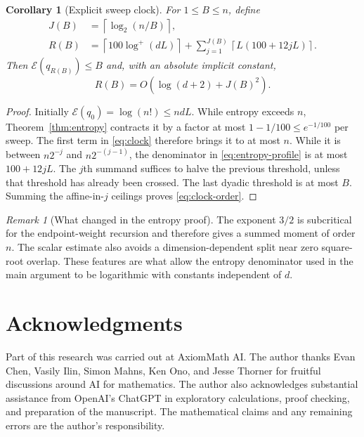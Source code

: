\documentclass[11pt]{article}
\numberwithin{equation}{section}
\newtheorem{corollary}[theorem]{Corollary}
\theoremstyle{definition}\newtheorem{definition}[theorem]{Definition}
\theoremstyle{remark}\newtheorem{remark}[theorem]{Remark}
\newcommand{\Ent}{\mathcal E}
\begin{document}
\begin{corollary}[Explicit sweep clock]\label{cor:clock}
For $1\le B\le n$, define
\begin{align}
 J(B)&=\left\lceil\log_2(n/B)\right\rceil,\nonumber\\
 R(B)&=\left\lceil100\log^+(dL)\right\rceil+
 \sum_{j=1}^{J(B)}\left\lceil L(100+12jL)\right\rceil.
 \label{eq:clock}
\end{align}
Then $\Ent(q_{R(B)})\le B$ and, with an absolute implicit constant,
\begin{equation}\label{eq:clock-order}
 R(B)=O\!\left(\log(d+2)+J(B)^2\right).
\end{equation}
\end{corollary}
\begin{proof}
Initially $\Ent(q_0)=\log(n!)\le ndL$. While entropy exceeds $n$,
Theorem~\ref{thm:entropy} contracts it by a factor at most
$1-1/100\le e^{-1/100}$ per sweep. The first term in \eqref{eq:clock}
therefore brings it to at most $n$. While it is between $n2^{-j}$ and
$n2^{-(j-1)}$, the denominator in \eqref{eq:entropy-profile} is at most
$100+12jL$. The $j$th summand suffices to halve the previous threshold,
unless that threshold has already been crossed. The last dyadic threshold
is at most $B$. Summing the affine-in-$j$ ceilings proves
\eqref{eq:clock-order}.
\end{proof}

\begin{remark}[What changed in the entropy proof]
The exponent $3/2$ is subcritical for the endpoint-weight recursion and
therefore gives a summed moment of order $n$.  The scalar estimate also avoids
a dimension-dependent split near zero square-root overlap.  These features are
what allow the entropy denominator used in the main argument to be
logarithmic with constants independent of $d$.
\end{remark}




\section*{Acknowledgments}
Part of this research was carried out at AxiomMath AI.  The author thanks
Evan Chen, Vasily Ilin, Simon Mahns, Ken Ono, and Jesse Thorner for fruitful
discussions around AI for mathematics.  The author also acknowledges
substantial assistance from OpenAI's ChatGPT in exploratory calculations, proof
checking, and preparation of the manuscript.  The mathematical claims and any
remaining errors are the author's responsibility.
\end{document}
